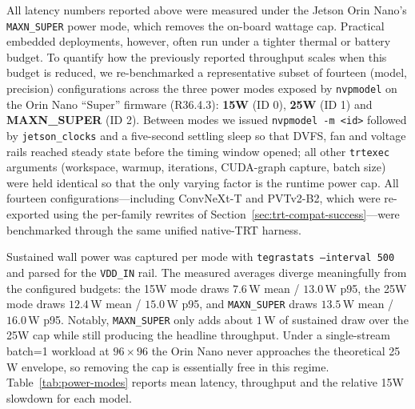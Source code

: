 \documentclass[runningheads,a4paper]{llncs}
\begin{document}
All latency numbers reported above were measured under the Jetson Orin Nano's \texttt{MAXN\_SUPER} power mode, which removes the on-board wattage cap. Practical embedded deployments, however, often run under a tighter thermal or battery budget. To quantify how the previously reported throughput scales when this budget is reduced, we re-benchmarked a representative subset of fourteen (model, precision) configurations across the three power modes exposed by \texttt{nvpmodel} on the Orin Nano ``Super'' firmware (R36.4.3): \textbf{15W} (ID 0), \textbf{25W} (ID 1) and \textbf{MAXN\_SUPER} (ID 2). Between modes we issued \texttt{nvpmodel -m <id>} followed by \texttt{jetson\_clocks} and a five-second settling sleep so that DVFS, fan and voltage rails reached steady state before the timing window opened; all other \texttt{trtexec} arguments (workspace, warmup, iterations, CUDA-graph capture, batch size) were held identical so that the only varying factor is the runtime power cap. All fourteen configurations---including ConvNeXt-T and PVTv2-B2, which were re-exported using the per-family rewrites of Section~\ref{sec:trt-compat-success}---were benchmarked through the same unified native-TRT harness.

Sustained wall power was captured per mode with \texttt{tegrastats --interval 500} and parsed for the \texttt{VDD\_IN} rail. The measured averages diverge meaningfully from the configured budgets: the 15W mode draws $7.6$\,W mean / $13.0$\,W p95, the 25W mode draws $12.4$\,W mean / $15.0$\,W p95, and \texttt{MAXN\_SUPER} draws $13.5$\,W mean / $16.0$\,W p95. Notably, \texttt{MAXN\_SUPER} only adds about $1$\,W of sustained draw over the 25W cap while still producing the headline throughput. Under a single-stream batch=1 workload at $96\times96$ the Orin Nano never approaches the theoretical 25\,W envelope, so removing the cap is essentially free in this regime.
Table~\ref{tab:power-modes} reports mean latency, throughput and the relative 15W slowdown for each model.
\end{document}
